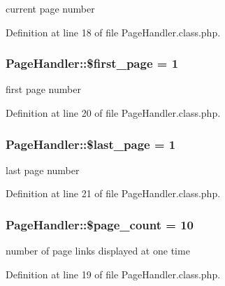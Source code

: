 current page number 



Definition at line 18 of file Page\+Handler.\+class.\+php.

\subsubsection[{\texorpdfstring{\$first\+\_\+page}{$first_page}}]{\setlength{\rightskip}{0pt plus 5cm}Page\+Handler\+::\$first\+\_\+page = 1}\hypertarget{classPageHandler_adee671fac811b630df2886a43108b5ff}{}\label{classPageHandler_adee671fac811b630df2886a43108b5ff}


first page number 



Definition at line 20 of file Page\+Handler.\+class.\+php.

\subsubsection[{\texorpdfstring{\$last\+\_\+page}{$last_page}}]{\setlength{\rightskip}{0pt plus 5cm}Page\+Handler\+::\$last\+\_\+page = 1}\hypertarget{classPageHandler_ad0a035b1ac1f86fe173d5ea4e8c2bef7}{}\label{classPageHandler_ad0a035b1ac1f86fe173d5ea4e8c2bef7}


last page number 



Definition at line 21 of file Page\+Handler.\+class.\+php.

\subsubsection[{\texorpdfstring{\$page\+\_\+count}{$page_count}}]{\setlength{\rightskip}{0pt plus 5cm}Page\+Handler\+::\$page\+\_\+count = 10}\hypertarget{classPageHandler_a48a16aadd0c373c8856df7df954f90ff}{}\label{classPageHandler_a48a16aadd0c373c8856df7df954f90ff}


number of page links displayed at one time 



Definition at line 19 of file Page\+Handler.\+class.\+php.

